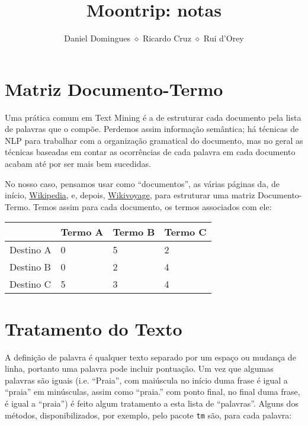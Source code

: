 \documentclass[twocolumn]{article}
\title{Moontrip: notas}
\author{Daniel Domingues \hspace{0.2cm}$\diamond$\hspace{0.2cm} Ricardo Cruz \hspace{0.2cm}$\diamond$\hspace{0.2cm} Rui d'Orey}
\begin{document}
\maketitle

\section{Matriz Documento-Termo}

Uma prática comum em Text Mining é a de estruturar cada documento pela lista de palavras que o compõe. Perdemos assim informação semântica; há técnicas de NLP para trabalhar com a organização gramatical do documento, mas no geral as técnicas baseadas em contar as ocorrências de cada palavra em cada documento acabam até por ser mais bem sucedidas.

No nosso caso, pensamos usar como ``documentos'', as várias páginas da, de início, \href{http://wikipedia.org}{Wikipedia}, e, depois, \href{http://wikivoyage.org}{Wikivoyage}, para estruturar uma matriz Documento-Termo. Temos assim para cada documento, os termos associados com ele:

\noindent
\begin{center}
\begin{tabular}{|l|l|l|l|}
\hline
	& Termo A & Termo B & Termo C \\\hline
	Destino A & 0 & 5 & 2 \\\hline
	Destino B & 0 & 2 & 4 \\\hline
	Destino C & 5 & 3 & 4 \\\hline
\end{tabular}
\end{center}

\section{Tratamento do Texto}

A definição de palavra é qualquer texto separado por um espaço ou mudança de linha, portanto uma palavra pode incluir pontuação. Um vez que algumas palavras são iguais (i.e. ``Praia'', com maiúscula no início duma frase é igual a ``praia'' em minúsculas, assim como ``praia.'' com ponto final, no final duma frase, é igual a ``praia'') é feito algum tratamento a esta lista de ``palavras''. Alguns dos métodos, disponibilizados, por exemplo, pelo pacote \texttt{tm} são, para cada palavra:
\end{document}
